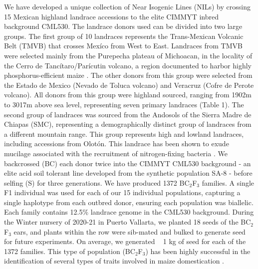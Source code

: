 We have developed a unique collection of Near Isogenic Lines (NILs) by crossing 15 Mexican highland landrace accessions to the elite CIMMYT inbred background CML530.
The landrace donors used can be divided into two large groups. The first group of 10 landraces represents the Trans-Mexican Volcanic Belt (TMVB) that crosses Mexíco from West to East.
Landraces from TMVB were selected mainly from the Purepecha plateau of Michoacan, in the locality of the Cerro de Tancítaro/Parícutin volcano, a region documented to harbor highly phosphorus-efficient maize \citep{bayuelo-jimenez2011}. The other donors from this group were selected from the Estado de Mexico (Nevado de Toluca volcano) and Veracruz (Cofre de Perote volcano).
All donors from this group were highland sourced, ranging from 1902m to 3017m above sea level, representing seven primary landraces (Table 1). The second group of landraces was sourced from the Andosols of the Sierra Madre de Chiapas (SMC), representing a demographically distinct group of landraces from a different mountain range. This group represents high and lowland landraces, including accessions from Olotón. This landrace has been shown to exude mucilage associated with the recruitment of nitrogen-fixing bacteria \citep{vandeynze2018}.
We backcrossed (BC) each donor twice into the CIMMYT CML530 background - an elite acid soil tolerant line developed from the synthetic population SA-8 \citep{granados1995} - before selfing (S) for three generations. We have produced 1372 BC$_2$F$_3$ families.
A single F1 individual was used for each of our 15 individual populations, capturing a single haplotype from each outbred donor, ensuring each population was biallelic. Each family contains 12.5\% landrace genome in the CML530 background. During the Winter nursery of 2020-21 in Puerto Vallarta, we planted 18 seeds of the BC$_2$F$_3$ ears, and plants within the row were sib-mated and bulked to generate seed for future experiments. On average, we generated ~ 1 kg of seed for each of the 1372 families.
This type of population (BC$_2$F$_3$) has been highly successful in the identification of several types of traits involved in maize domestication \citep{xu2017b,guo2018a,liang2019,tian2019}.
\clearpage
